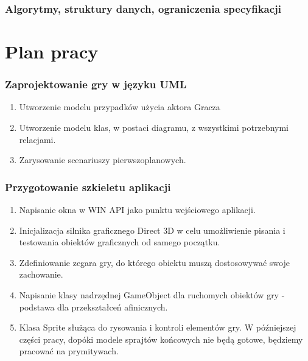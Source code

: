 \documentclass[a4paper,twoside]{article}
\begin{document}
	
	
	\section{Algorytmy, struktury danych, ograniczenia specyfikacji}
	
	\newpage
	
	\part{Plan pracy}
		\section{Zaprojektowanie gry w języku UML}
			\begin{enumerate}[label=\alph*.]
				\item Utworzenie modelu przypadków użycia aktora Gracza
				\item Utworzenie modelu klas, w postaci diagramu, z wszystkimi potrzebnymi relacjami.
				\item Zarysowanie scenariuszy pierwszoplanowych.
			\end{enumerate}
		\section{Przygotowanie szkieletu aplikacji}
			\begin{enumerate}[label=\alph*.]
				\item Napisanie okna w WIN API jako punktu wejściowego aplikacji.
				\item Inicjalizacja silnika graficznego Direct 3D w celu umożliwienie pisania i testowania obiektów graficznych od samego początku.
				\item Zdefiniowanie zegara gry, do którego obiektu muszą dostosowywać swoje zachowanie.
				\item Napisanie klasy nadrzędnej GameObject dla ruchomych obiektów gry - podstawa dla przekształceń afinicznych.
				\item Klasa Sprite służąca do rysowania i kontroli elementów gry. W późniejszej części pracy, dopóki modele sprajtów końcowych nie będą gotowe, będziemy pracować na prymitywach.
			\end{enumerate}
\end{document}
